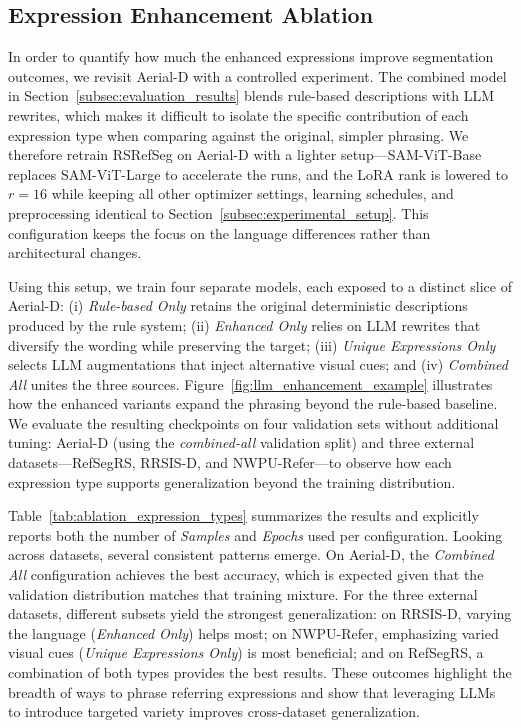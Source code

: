 \subsection{Expression Enhancement Ablation}
\label{subsec:ablation_studies}

In order to quantify how much the enhanced expressions improve segmentation outcomes, we revisit Aerial-D with a controlled experiment. The combined model in Section~\ref{subsec:evaluation_results} blends rule-based descriptions with LLM rewrites, which makes it difficult to isolate the specific contribution of each expression type when comparing against the original, simpler phrasing. We therefore retrain RSRefSeg on Aerial-D with a lighter setup—SAM-ViT-Base replaces SAM-ViT-Large to accelerate the runs, and the LoRA rank is lowered to \(r=16\) while keeping all other optimizer settings, learning schedules, and preprocessing identical to Section~\ref{subsec:experimental_setup}. This configuration keeps the focus on the language differences rather than architectural changes.

Using this setup, we train four separate models, each exposed to a distinct slice of Aerial-D: (i) \emph{Rule-based Only} retains the original deterministic descriptions produced by the rule system; (ii) \emph{Enhanced Only} relies on LLM rewrites that diversify the wording while preserving the target; (iii) \emph{Unique Expressions Only} selects LLM augmentations that inject alternative visual cues; and (iv) \emph{Combined All} unites the three sources. Figure~\ref{fig:llm_enhancement_example} illustrates how the enhanced variants expand the phrasing beyond the rule-based baseline. We evaluate the resulting checkpoints on four validation sets without additional tuning: Aerial-D (using the \emph{combined-all} validation split) and three external datasets—RefSegRS, RRSIS-D, and NWPU-Refer—to observe how each expression type supports generalization beyond the training distribution.

Table~\ref{tab:ablation_expression_types} summarizes the results and explicitly reports both the number of \emph{Samples} and \emph{Epochs} used per configuration. Looking across datasets, several consistent patterns emerge. On Aerial-D, the \emph{Combined All} configuration achieves the best accuracy, which is expected given that the validation distribution matches that training mixture. For the three external datasets, different subsets yield the strongest generalization: on RRSIS-D, varying the language (\emph{Enhanced Only}) helps most; on NWPU-Refer, emphasizing varied visual cues (\emph{Unique Expressions Only}) is most beneficial; and on RefSegRS, a combination of both types provides the best results. These outcomes highlight the breadth of ways to phrase referring expressions and show that leveraging LLMs to introduce targeted variety improves cross-dataset generalization.


